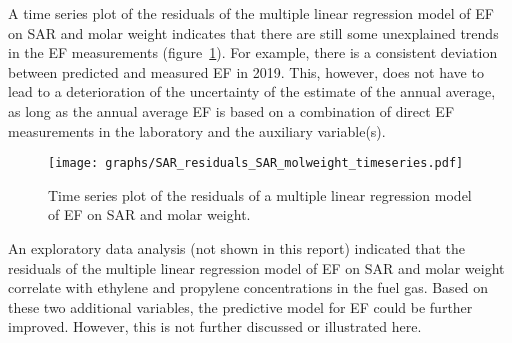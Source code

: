 A time series plot of the residuals of the multiple linear regression model of EF on SAR and molar weight indicates that there are still some unexplained trends in the EF measurements (figure~\ref{fig:SAR_residuals_SAR_molweight_timeseries}). For example, there is a consistent deviation between predicted and measured EF in 2019. This, however, does not have to lead to a deterioration of the uncertainty of the estimate of the annual average, as long as the annual average EF is based on a combination of direct EF measurements in the laboratory and the auxiliary variable(s).

\begin{figure}[h]
	\centering
	\texttt{[image: graphs/SAR\_residuals\_SAR\_molweight\_timeseries.pdf]}
	\caption{Time series plot of the residuals of a multiple linear regression model of EF on SAR and molar weight. }
	\label{fig:SAR_residuals_SAR_molweight_timeseries}
\end{figure}

An exploratory data analysis (not shown in this report) indicated that the residuals of the multiple linear regression model of EF on SAR and molar weight correlate with ethylene and propylene concentrations in the fuel gas. Based on these two additional variables, the predictive model for EF could be further improved. However, this is not further discussed or illustrated here.
%
%
